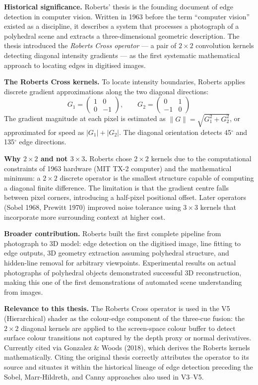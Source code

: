 \documentclass[11pt, a4paper]{article}
\begin{document}
\textbf{Historical significance.} Roberts' thesis is the founding document of edge detection in computer vision. Written in 1963 before the term ``computer vision'' existed as a discipline, it describes a system that processes a photograph of a polyhedral scene and extracts a three-dimensional geometric description. The thesis introduced the \textit{Roberts Cross operator} --- a pair of $2\times2$ convolution kernels detecting diagonal intensity gradients --- as the first systematic mathematical approach to locating edges in digitised images.

\textbf{The Roberts Cross kernels.} To locate intensity boundaries, Roberts applies discrete gradient approximations along the two diagonal directions:
\[
  G_1 = \begin{pmatrix} 1 & 0 \\ 0 & -1 \end{pmatrix}, \qquad G_2 = \begin{pmatrix} 0 & 1 \\ -1 & 0 \end{pmatrix}
\]
The gradient magnitude at each pixel is estimated as $\|G\| = \sqrt{G_1^2 + G_2^2}$, or approximated for speed as $|G_1| + |G_2|$. The diagonal orientation detects 45$^\circ$ and 135$^\circ$ edge directions.

\textbf{Why $2\times2$ and not $3\times3$.} Roberts chose $2\times2$ kernels due to the computational constraints of 1963 hardware (MIT TX-2 computer) and the mathematical minimum: a $2\times2$ discrete operator is the smallest structure capable of computing a diagonal finite difference. The limitation is that the gradient centre falls between pixel corners, introducing a half-pixel positional offset. Later operators (Sobel 1968, Prewitt 1970) improved noise tolerance using $3\times3$ kernels that incorporate more surrounding context at higher cost.

\textbf{Broader contribution.} Roberts built the first complete pipeline from photograph to 3D model: edge detection on the digitised image, line fitting to edge outputs, 3D geometry extraction assuming polyhedral structure, and hidden-line removal for arbitrary viewpoints. Experimental results on actual photographs of polyhedral objects demonstrated successful 3D reconstruction, making this one of the first demonstrations of automated scene understanding from images.

\textbf{Relevance to this thesis.} The Roberts Cross operator is used in the V5 (Hierarchical) shader as the colour-edge component of the three-cue fusion: the $2\times2$ diagonal kernels are applied to the screen-space colour buffer to detect surface colour transitions not captured by the depth proxy or normal derivatives. Currently cited via Gonzalez \& Woods (2018), which derives the Roberts kernels mathematically. Citing the original thesis correctly attributes the operator to its source and situates it within the historical lineage of edge detection preceding the Sobel, Marr-Hildreth, and Canny approaches also used in V3--V5.
\end{document}
